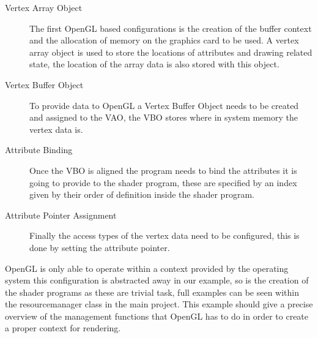 \begin{description}
\item[Vertex Array Object] The first OpenGL based configurations is the 
creation of the buffer context and the allocation of memory on the graphics card
to be used. A vertex array object is used to store the locations of attributes 
and drawing related state, the location of the array data is also stored with
this object.
\item[Vertex Buffer Object]
To provide data to OpenGL a Vertex Buffer Object needs to be created
and assigned to the VAO, the VBO stores where in system memory the vertex data 
is. 
\item[Attribute Binding]
Once the VBO is aligned the program needs to bind the attributes it is going
to provide to the shader program, these are specified by an index given by their
order of definition inside the shader program.
\item[Attribute Pointer Assignment]
Finally the access types of the 
vertex data need to be configured, this is done by setting the attribute 
pointer. 
\end{description}

OpenGL is only able to operate within a context provided by the operating system
this configuration is abstracted away in our example, so is the creation of the
shader programs as these are trivial task, full examples can be seen within the
resourcemanager class in the main project. This example should give a precise
overview of the management functions that OpenGL has to do in order to create a 
proper context for rendering.\\



